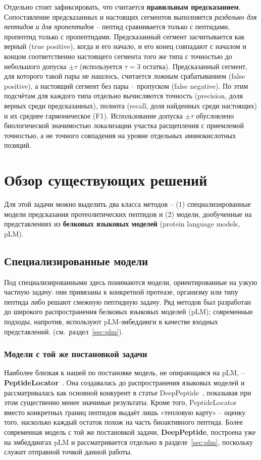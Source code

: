 \documentclass{article}
\begin{document}
Отдельно стоит зафиксировать, что считается \textbf{правильным предсказанием}. Сопоставление предсказанных и настоящих сегментов выполняется \emph{раздельно для пептидов и для пропептидов} -- пептид сравнивается только с пептидами, пропептид только с пропептидами. Предсказанный сегмент засчитывается как верный (true positive), когда и его начало, и его конец совпадают с началом и концом соответственно настоящего сегмента того же типа с точностью до небольшого допуска $\pm\tau$ (используется $\tau=3$ остатка). Предсказанный сегмент, для которого такой пары не нашлось, считается ложным срабатыванием (false positive), а настоящий сегмент без пары -- пропуском (false negative). По этим подсчётам для каждого типа отдельно вычисляются точность (precision, доля верных среди предсказанных), полнота (recall, доля найденных среди настоящих) и их среднее гармоническое (F1). Использование допуска $\pm \tau$ обусловлено биологической значимостью локализации участка расщепления с приемлемой точностью, а не точного совпадения на уровне отдельных аминокислотных позиций.

\section{Обзор существующих решений}
Для этой задачи можно выделить два класса методов -- (1) специализированные модели предсказания протеолитических пептидов и (2) модели, дообученные на представлениях из \textbf{белковых языковых моделей} (protein language models, pLM).

\subsection{Специализированные модели}
Под специализированными здесь понимаются модели, ориентированные на узкую частную задачу: они привязаны к конкретной протеазе, организму или типу пептида либо решают смежную пептидную задачу. Ряд методов был разработан до широкого распространения белковых языковых моделей (pLM); современные подходы, напротив, используют pLM‑эмбеддинги в качестве входных представлений. (см.\ раздел~\ref{sec:plm}).

\subsubsection{Модели с той же постановкой задачи}
Наиболее близкая к нашей по постановке модель, не опирающаяся на pLM, -- \textbf{PeptideLocator}~\cite{mooney2013peptidelocator}. Она создавалась до распространения языковых моделей и рассматривалась как основной конкурент в статье DeepPeptide~\cite{deeppeptide2023}, показывая при этом существенно менее значимые результаты. Кроме того, PeptideLocator вместо конкретных границ пептидов выдаёт лишь «тепловую карту» -- оценку того, насколько каждый остаток похож на часть биоактивного пептида. Более современная модель с той же постановкой задачи, \textbf{DeepPeptide}, построена уже на эмбеддингах pLM и рассматривается отдельно в разделе~\ref{sec:plm}, поскольку служит отправной точкой данной работы.
\end{document}
